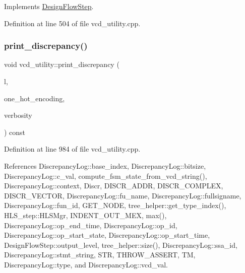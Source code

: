 Implements \hyperlink{classDesignFlowStep_a1783abe0c1d162a52da1e413d5d1ef05}{Design\+Flow\+Step}.



Definition at line 504 of file vcd\+\_\+utility.\+cpp.

\mbox{\label{classvcd__utility_a4f2a5d8b68fe639e2d1eeb4f4c4c429a}} 
\subsubsection{\texorpdfstring{print\+\_\+discrepancy()}{print\_discrepancy()}}
{\footnotesize\ttfamily void vcd\+\_\+utility\+::print\+\_\+discrepancy (\begin{DoxyParamCaption}\item[{const \hyperlink{structDiscrepancyLog}{Discrepancy\+Log} \&}]{l,  }\item[{bool}]{one\+\_\+hot\+\_\+encoding,  }\item[{const int}]{verbosity }\end{DoxyParamCaption}) const\hspace{0.3cm}{\ttfamily [protected]}}



Definition at line 984 of file vcd\+\_\+utility.\+cpp.



References Discrepancy\+Log\+::base\+\_\+index, Discrepancy\+Log\+::bitsize, Discrepancy\+Log\+::c\+\_\+val, compute\+\_\+fsm\+\_\+state\+\_\+from\+\_\+vcd\+\_\+string(), Discrepancy\+Log\+::context, Discr, D\+I\+S\+C\+R\+\_\+\+A\+D\+DR, D\+I\+S\+C\+R\+\_\+\+C\+O\+M\+P\+L\+EX, D\+I\+S\+C\+R\+\_\+\+V\+E\+C\+T\+OR, Discrepancy\+Log\+::fu\+\_\+name, Discrepancy\+Log\+::fullsigname, Discrepancy\+Log\+::fun\+\_\+id, G\+E\+T\+\_\+\+N\+O\+DE, tree\+\_\+helper\+::get\+\_\+type\+\_\+index(), H\+L\+S\+\_\+step\+::\+H\+L\+S\+Mgr, I\+N\+D\+E\+N\+T\+\_\+\+O\+U\+T\+\_\+\+M\+EX, max(), Discrepancy\+Log\+::op\+\_\+end\+\_\+time, Discrepancy\+Log\+::op\+\_\+id, Discrepancy\+Log\+::op\+\_\+start\+\_\+state, Discrepancy\+Log\+::op\+\_\+start\+\_\+time, Design\+Flow\+Step\+::output\+\_\+level, tree\+\_\+helper\+::size(), Discrepancy\+Log\+::ssa\+\_\+id, Discrepancy\+Log\+::stmt\+\_\+string, S\+TR, T\+H\+R\+O\+W\+\_\+\+A\+S\+S\+E\+RT, TM, Discrepancy\+Log\+::type, and Discrepancy\+Log\+::vcd\+\_\+val.



